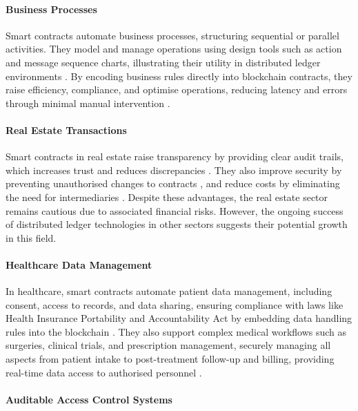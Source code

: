 \paragraph{Business Processes}

Smart contracts automate business processes, structuring sequential or parallel activities. They model and manage operations using design tools such as action and message sequence charts, illustrating their utility in distributed ledger environments \cite{MagazzeniEtAl2017}. By encoding business rules directly into blockchain contracts, they raise efficiency, compliance, and optimise operations, reducing latency and errors through minimal manual intervention \cite{ChikovEtAl2023}.

\paragraph{Real Estate Transactions}

Smart contracts in real estate raise transparency by providing clear audit trails, which increases trust and reduces discrepancies \cite{LaarabiEtAl2022, MohantaEtAl2018}. They also improve security by preventing unauthorised changes to contracts \cite{UllahEtAl2023, LaarabiEtAl2022}, and reduce costs by eliminating the need for intermediaries \cite{UzairEtAl2018, MohantaEtAl2018}. Despite these advantages, the real estate sector remains cautious due to associated financial risks. However, the ongoing success of distributed ledger technologies in other sectors suggests their potential growth in this field.

\paragraph{Healthcare Data Management}

In healthcare, smart contracts automate patient data management, including consent, access to records, and data sharing, ensuring compliance with laws like Health Insurance Portability and Accountability Act by embedding data handling rules into the blockchain \cite{Khatoon2020}. They also support complex medical workflows such as surgeries, clinical trials, and prescription management, securely managing all aspects from patient intake to post-treatment follow-up and billing, providing real-time data access to authorised personnel \cite{Khatoon2020}.

\paragraph{Auditable Access Control Systems}

